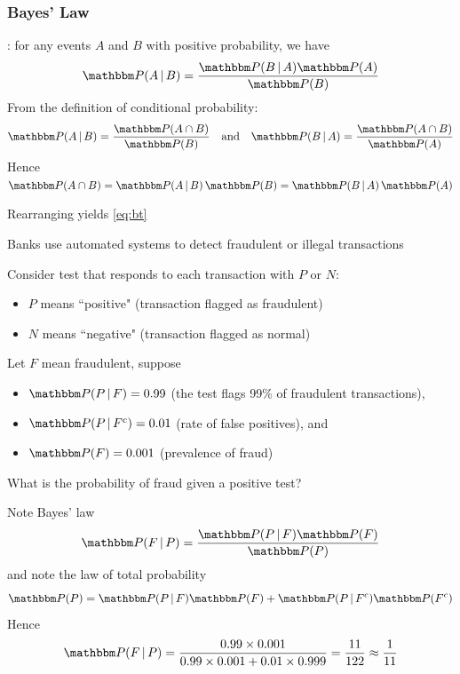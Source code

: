 \begin{frame}\frametitle{Bayes' Law}
    
    \vspace{2em}
    : for any events $A$ and $B$ with positive
    probability, we have
    \begin{equation}
        \label{eq:bt}
        \PP(A \given B) = \frac{\PP(B \given A) \PP(A)}{\PP(B)}
    \end{equation}
    \Prf 
    From the definition of conditional probability:
    $$
        \PP(A \given B)=\frac{\PP(A \cap B)}{\PP(B)}
        \quad \text{and} \quad
        \PP(B \given A) = \frac{\PP(A \cap B)}{\PP(A)}
    $$
    Hence
        $\PP(A \cap B) = \PP(A \given B)\, \PP(B) = \PP(B \given A)\, \PP(A)$
    
    Rearranging yields \eqref{eq:bt}
    
\end{frame}

\begin{frame}

    \vspace{2em}
    \Eg
    Banks use automated systems to detect fraudulent or illegal
    transactions
    
    Consider test that responds to each transaction with $P$
    or $N$:
    \begin{itemize}
        \item $P$ means ``positive" (transaction flagged as fraudulent)
        \item $N$ means ``negative" (transaction flagged as normal)
    \end{itemize}
    
    Let $F$ mean fraudulent, suppose
    \begin{itemize}
        \item $\PP( P \given F) = 0.99$ (the test flags 99\% of fraudulent
            transactions),
        \item $\PP( P \given F^c ) = 0.01$ (rate of false positives), and
        \item $\PP( F ) = 0.001$  (prevalence of fraud)
    \end{itemize}
\end{frame}

\begin{frame}

    \vspace{2em}
    What is the probability of fraud given a positive test?
    
    Note Bayes' law
    $$
        \PP(F \,|\, P) = \frac{\PP(P \given F)\PP(F)}{\PP(P)}
    $$
    and note the law of total probability 
        $$
        \PP(P) = \PP(P \given F) \PP(F) + \PP(P \given F^c) \PP(F^c)
        $$
    Hence
    $$
        \PP(F \,|\, P) 
        = \frac{0.99 \times 0.001}{0.99 \times 0.001 + 0.01 \times 0.999}
        = \frac{11}{122}
        \approx \frac{1}{11}
    $$
    
\end{frame}

